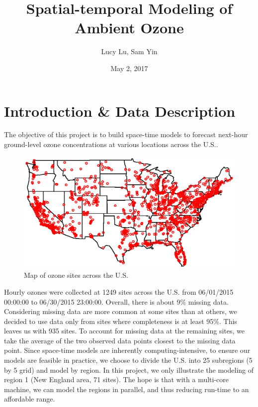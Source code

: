 \documentclass[12pt]{article}
\begin{document}
\title{Spatial-temporal Modeling of Ambient Ozone}
\author{Lucy Lu, Sam Yin}
\date{May 2, 2017}
\maketitle

\section{Introduction \& Data Description}
The objective of this project is to build space-time models to forecast next-hour ground-level ozone concentrations at various locations across the U.S.. 

\begin{figure}[H]
\centering
\includegraphics[scale = 0.4]{site_map.eps}
\caption{Map of ozone sites across the U.S.}
\end{figure}

Hourly ozones were collected at 1249 sites across the U.S. from 06/01/2015 00:00:00 to 06/30/2015 23:00:00. Overall, there is about 9\% missing data. Considering missing data are more common at some sites than at others, we decided to use data only from sites where completeness is at least 95\%. This leaves us with 935 sites. To account for missing data at the remaining sites, we take the average of the two observed data points closest to the missing data point. Since space-time models are inherently computing-intensive, to ensure our models are feasible in practice, we choose to divide the U.S. into 25 subregions (5 by 5 grid) and model by region. In this project, we only illustrate the modeling of region 1 (New England area, 71 sites). The hope is that with a multi-core machine, we can model the regions in parallel, and thus reducing run-time to an affordable range. 
\end{document}
